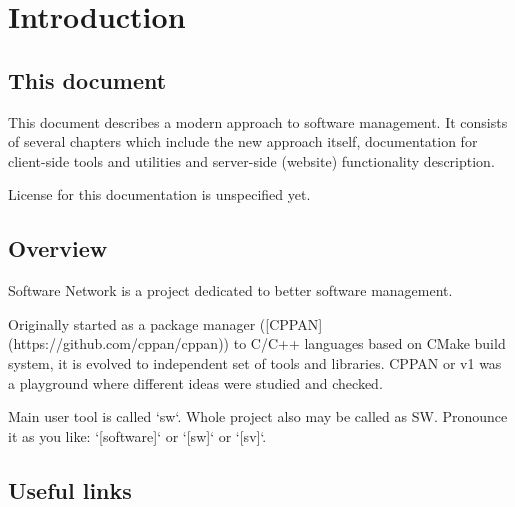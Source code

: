 
\chapter*{Introduction}

\section*{This document}

This document describes a modern approach to software management.
It consists of several chapters which include the new approach itself, documentation for client-side tools and utilities and server-side (website) functionality description.

License for this documentation is unspecified yet.

\section*{Overview}

Software Network is a project dedicated to better software management.

Originally started as a package manager ([CPPAN](https://github.com/cppan/cppan)) to C/C++ languages based on CMake build system, it is evolved to independent set of tools and libraries.
CPPAN or v1 was a playground where different ideas were studied and checked.

Main user tool is called `sw`. Whole project also may be called as SW. Pronounce it as you like: `[software]` or `[sw]` or `[sv]`.

\section*{Useful links}

